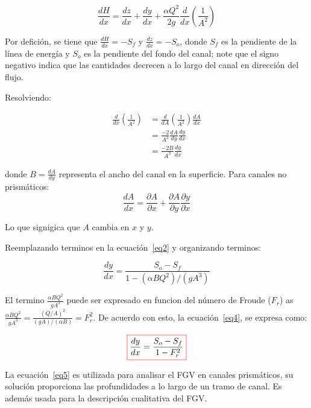 \documentclass[11pt, oneside]{article}
\begin{document}
\begin{equation}
    \frac{dH}{dx} = \frac{dz}{dx} + \frac{dy}{dx} + \frac{\alpha Q^2}{2g} \frac{d}{dx}\left( \frac{1}{A^2}\right)
\label{eq2}
\end{equation}

Por defici\'on, se tiene que $\frac{dH}{dx} = -S_f $ y $\frac{dz}{dx} = -S_o $, donde $S_f$ es la pendiente de la l\'inea de energ\'ia y $S_o$ es la pendiente del fondo del canal; note que el signo negativo indica que las cantidades decrecen a lo largo del canal en direcci\'on del flujo.

Resolviendo:

\begin{equation}
\begin{split}
    \frac{d}{dx}\left( \frac{1}{A^2}\right) & = \frac{d}{dA}\left( \frac{1}{A^2}\right) \frac{dA}{dx} \\
                                            & = \frac{-2}{A^3} \frac{dA}{dy} \frac{dy}{dx} \\
                                            & = \frac{-2B}{A^3}  \frac{dy}{dx}
\end{split}
\label{eq3}
\end{equation}

donde $B = \frac{dA}{dy}$ representa el ancho del canal en la superficie. Para canales no prism\'aticos:
$$
\frac{dA}{dx} = \frac{\partial A}{\partial x} + \frac{\partial A}{\partial y} \frac{\partial y}{\partial x}
$$

Lo que signigica que $A$ cambia en $x$ y $y$. 

Reemplazando terminos en la ecuaci\'on~\ref{eq2} y organizando terminos:

\begin{equation}
    \frac{dy}{dx} = \frac{S_o - S_f }{1-\left(\alpha B Q^2 \right) /\left(g A^3 \right)}
\label{eq4}
\end{equation}

El termino $\frac{\alpha B Q^2 }{g A^3} $ puede ser expresado en funcion del n\'umero de Froude ($F_r$) as $\frac{\alpha B Q^2 }{g A^3}  = \frac{\left(Q/A \right)^2}{\left( gA \right)/\left( \alpha B \right) } = F_r^2 $. De acuerdo con esto, la ecuaci\'on~\ref{eq4}, se expresa como:

\begin{equation}
    \color{red}\boxed{\color{black}   \frac{dy}{dx} = \frac{S_o - S_f }{1-F_r^2}}
\label{eq5}
\end{equation}

La ecuaci\'on~\ref{eq5} es utilizada para analisar el FGV en canales prism\'aticos, su soluci\'on proporciona las profundidades a lo largo de un tramo de canal. Es adem\'as usada para la descripci\'on cualitativa del FGV. 
\end{document}

